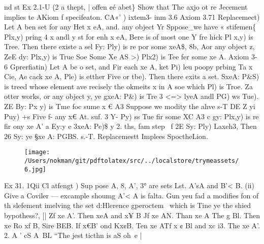 \documentclass[a4paper,12pt]{article}
\begin{document}
    nd st  Ex 2.1-U (2 a thept, | offen ¢é abet\}  Show that The axjo ot re Jecement implies te AKiom f specifeaton.  CA«' )    ixtem3- inm 3.6  Axiom 3.71 Replacemect)  Let A ben set for any Het x eA, and. any object Yr Sppose\_we have « stifemen\{  Plx,y) pring 4 x andl y st for enh x eA, Bere is of most one Y fre hick  Pl x,y) is Tree. Then there existe a sel Fy: Ply) is re por some xeA\$,  8b, Aor any object z, ZeE dy: Plx,y) is True Soe Some Xe AS  >) Plx2) is Tee fer some xe A.  Axiom 3-6 Gprerfiatin)  Let A be o set, and Fir each xe A, ket Pi) leu poopy prbing Ta x  Cie, Ae cack xe A, Ple) is etther Five or tbe). Then there exits a set.  SxeA: P\&S) is treed whose element ave recisely the okmeits x in A  soe which Pl) is Troe. Za otter works, or any object y,  ye gxeA: P\&) is Tre 3 <=> lyeA andl PG) ws Tue).    ZE By: Px y) is Tme foc sume x € A3    Suppose we modity the ahve s-T DE Z yi Puy) +s Five f- any x€ At.  suf.    3 Y- Py) ss Tue fir some XC A3 c gy: Plx,y) is re fir ony xe A’  a  Ey:y e 3xeA: Pe)\$ y  2. ths, fam step \, f 2E Sy: Ply) Laxeh3,  Then 26 Sy: ye §xe A: PGBS.  s.-T. Replacemestt Implees SpoctheLion. 

\vspace{10pt}

\par

\vspace{10pt}

\begin{figure}[h]

\texttt{[image: /Users/nokman/git/pdftolatex/src/../localstore/trymeassets/6.jpg]}

\centering

\end{figure}

\par

\vspace{10pt}

    Ex 31. 1Qii Cl atfengt )  Sup pose A, 8, A’, 3° are sets Lst. A'sA and B’< B.    (ii) Give a Coviler — excample shoumg A’\B < A\8 is falta.  Gun yeu fad a modifies fon of th slefement imelving the set d:Hlerence gperoctem \  which is Tine ye the shied bypothess?,    [| Zf xe A'\B. Then xeA and x¥ B  Jf xe AN. Than xe A  The g Bl. Then xe Ro xf B, Sire BEB.  If x€B' ond Kx¢B. Ten xe A\B  Tf x ¢ Bl and xc i3. The xe A\B’.    2. A \B’ cS A\ BL “The jest ticthn is aS oh~e | 

\vspace{10pt}
\end{document}
